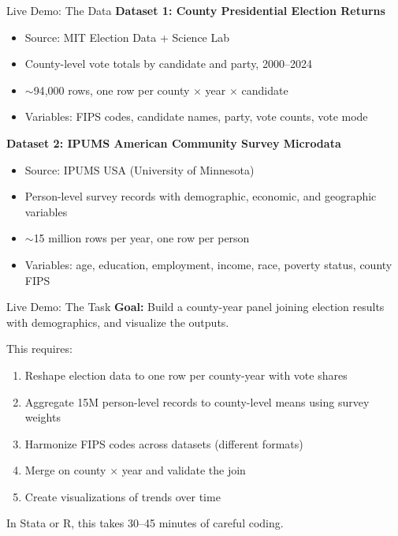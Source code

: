 \documentclass[aspectratio=169, 11pt]{beamer}
\begin{document}

\begin{frame}{Live Demo: The Data}
  \textbf{Dataset 1: County Presidential Election Returns}
  \begin{itemize}
    \item Source: MIT Election Data + Science Lab
    \item County-level vote totals by candidate and party, 2000--2024
    \item ${\sim}$94{,}000 rows, one row per county $\times$ year $\times$ candidate
    \item Variables: FIPS codes, candidate names, party, vote counts, vote mode
  \end{itemize}

  \vspace{0.5em}
  \textbf{Dataset 2: IPUMS American Community Survey Microdata}
  \begin{itemize}
    \item Source: IPUMS USA (University of Minnesota)
    \item Person-level survey records with demographic, economic, and geographic variables
    \item ${\sim}$15 million rows per year, one row per person
    \item Variables: age, education, employment, income, race, poverty status, county FIPS
  \end{itemize}
\end{frame}

\begin{frame}{Live Demo: The Task}
  \textbf{Goal:} Build a county-year panel joining election results with demographics, and visualize the outputs.

  \vspace{0.5em}
  This requires:
  \begin{enumerate}
    \item Reshape election data to one row per county-year with vote shares
    \item Aggregate 15M person-level records to county-level means using survey weights
    \item Harmonize FIPS codes across datasets (different formats)
    \item Merge on county $\times$ year and validate the join
    \item Create visualizations of trends over time
  \end{enumerate}

  \vspace{0.5em}
  In Stata or R, this takes 30--45 minutes of careful coding.

\end{frame}
\end{document}
